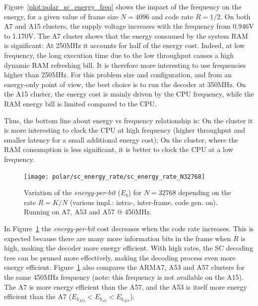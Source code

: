 Figure~\ref{plot:polar_sc_energy_freq} shows the impact of the frequency on the
energy, for a given value of frame size $N=4096$ and code rate $R=1/2$. On both
A7 and A15 clusters, the supply voltage increases with the frequency from 0.946V
to 1.170V. The A7 \little cluster shows that the energy consumed by the system
RAM is significant: At 250MHz it accounts for half of the energy cost. Indeed,
at low frequency, the long execution time due to the low throughput causes a
high dynamic RAM refreshing bill. It is therefore more interesting to use
frequencies higher than 250MHz. For this problem size and configuration, and
from an energy-only point of view, the best choice is to run the decoder at
350MHz. On the A15 \big cluster, the energy cost is mainly driven by the CPU
frequency, while the RAM energy bill is limited compared to the CPU.

Thus, the bottom line about energy vs frequency relationship is: On the \little
cluster it is more interesting to clock the CPU at high frequency (higher
throughput and smaller latency for a small additional energy cost); On the
\big cluster, where the RAM consumption is less significant, it is better to
clock the CPU at a low frequency.

\begin{figure}
  \centering
  \texttt{[image: polar/sc\_energy\_rate/sc\_energy\_rate\_N32768]}
  \caption{Variation of the \emph{energy-per-bit} ($E_b$) for $N = 32768$
    depending on the rate $R = K / N$ (various impl.: intra-, inter-frame, code
    gen. on). Running on A7, A53 and A57 @ 450MHz.}
  \label{plot:polar_sc_energy_rate}
\end{figure}

In Figure~\ref{plot:polar_sc_energy_rate} the \emph{energy-per-bit} cost
decreases when the code rate increases. This is expected because there are many
more information bits in the frame when $R$ is high, making the decoder more
energy efficient. With high rates, the SC decoding tree can be pruned more
effectively, making the decoding process even more energy efficient.
Figure~\ref{plot:polar_sc_energy_rate} also compares the ARM\R A7, A53 and A57
clusters for the same 450MHz frequency (note: this frequency is not available on
the A15). The \little A7 is more energy efficient than the \big A57, and the
\little A53 is itself more energy efficient than the \little A7
($E_{b_{A53}} < E_{b_{A7}} < E_{b_{A57}}$).

